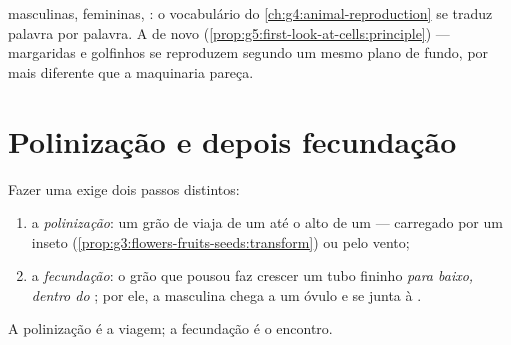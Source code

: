 \begin{remark}\label{rem:g5:flower-to-fruit:sameplan}
 masculinas,  femininas, : o vocabulário do
\cref{ch:g4:animal-reproduction} se traduz palavra por palavra. A
 de novo
(\cref{prop:g5:first-look-at-cells:principle}) --- margaridas e
golfinhos se reproduzem segundo um mesmo plano de fundo, por mais
diferente que a maquinaria pareça.
\end{remark}

\section{Polinização e depois fecundação}

\begin{definition}\label{def:g5:flower-to-fruit:steps}
Fazer uma  exige dois passos distintos:
\begin{enumerate}
  \item a \emph{polinização}: um grão de 
        viaja de um  até o alto de um  --- carregado
        por um inseto
        (\cref{prop:g3:flowers-fruits-seeds:transform}) ou pelo
        vento;
  \item a \emph{fecundação}: o grão que
        pousou faz crescer um tubo fininho \emph{para baixo, dentro
        do }; por ele, a  masculina chega a um óvulo e
        se junta à .
\end{enumerate}
A polinização é a viagem; a fecundação é o encontro.
\end{definition}

